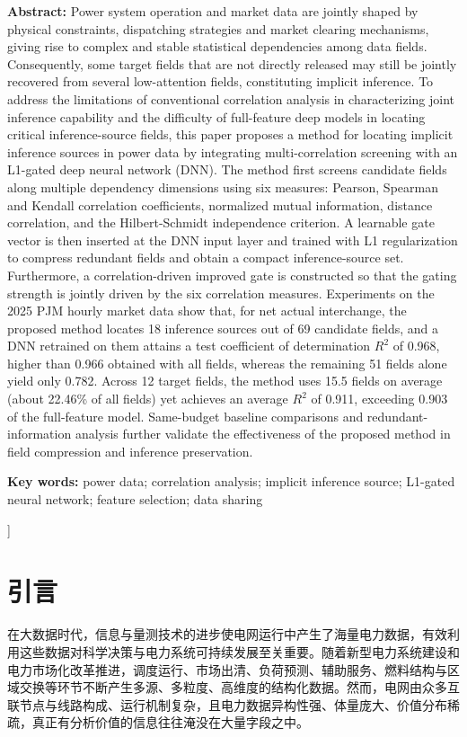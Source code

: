 \documentclass[UTF8,zihao=5,twoside]{ctexart}
\numberwithin{equation}{section}
\newcommand{\fundcn}{基金项目：无。}
\newcommand{\funden}{Foundation item: None.}
\begin{document}
\noindent\textbf{Abstract:} Power system operation and market data are jointly shaped by physical constraints, dispatching strategies and market clearing mechanisms, giving rise to complex and stable statistical dependencies among data fields. Consequently, some target fields that are not directly released may still be jointly recovered from several low-attention fields, constituting implicit inference. To address the limitations of conventional correlation analysis in characterizing joint inference capability and the difficulty of full-feature deep models in locating critical inference-source fields, this paper proposes a method for locating implicit inference sources in power data by integrating multi-correlation screening with an L1-gated deep neural network (DNN). The method first screens candidate fields along multiple dependency dimensions using six measures: Pearson, Spearman and Kendall correlation coefficients, normalized mutual information, distance correlation, and the Hilbert-Schmidt independence criterion. A learnable gate vector is then inserted at the DNN input layer and trained with L1 regularization to compress redundant fields and obtain a compact inference-source set. Furthermore, a correlation-driven improved gate is constructed so that the gating strength is jointly driven by the six correlation measures. Experiments on the 2025 PJM hourly market data show that, for net actual interchange, the proposed method locates 18 inference sources out of 69 candidate fields, and a DNN retrained on them attains a test coefficient of determination $R^2$ of 0.968, higher than 0.966 obtained with all fields, whereas the remaining 51 fields alone yield only 0.782. Across 12 target fields, the method uses 15.5 fields on average (about 22.46\% of all fields) yet achieves an average $R^2$ of 0.911, exceeding 0.903 of the full-feature model. Same-budget baseline comparisons and redundant-information analysis further validate the effectiveness of the proposed method in field compression and inference preservation.\par
\noindent\textbf{Key words:} power data; correlation analysis; implicit inference source; L1-gated neural network; feature selection; data sharing\par\vspace{0.8em}

\noindent{\small\fundcn\\\funden}
\vspace{0.8em}
]

\section{引言}
在大数据时代，信息与量测技术的进步使电网运行中产生了海量电力数据，有效利用这些数据对科学决策与电力系统可持续发展至关重要\cite{ref-liu-cps}。随着新型电力系统建设和电力市场化改革推进，调度运行、市场出清、负荷预测、辅助服务、燃料结构与区域交换等环节不断产生多源、多粒度、高维度的结构化数据\cite{ref-ma-pjm,ref-fan-pjm}。然而，电网由众多互联节点与线路构成、运行机制复杂，且电力数据异构性强、体量庞大、价值分布稀疏，真正有分析价值的信息往往淹没在大量字段之中\cite{ref-xing-micdnn}。
\end{document}
